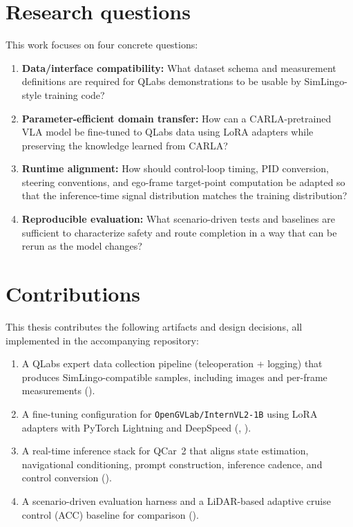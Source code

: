 \section{Research questions}
\label{sec:research-questions}
This work focuses on four concrete questions:
\begin{enumerate}[leftmargin=*,itemsep=0.25em]
  \item \textbf{Data/interface compatibility:} What dataset schema and measurement definitions are required for QLabs demonstrations to be usable by SimLingo-style training code?
  \item \textbf{Parameter-efficient domain transfer:} How can a CARLA-pretrained VLA model be fine-tuned to QLabs data using LoRA adapters while preserving the knowledge learned from CARLA?
  \item \textbf{Runtime alignment:} How should control-loop timing, PID conversion, steering conventions, and ego-frame target-point computation be adapted so that the inference-time signal distribution matches the training distribution?
  \item \textbf{Reproducible evaluation:} What scenario-driven tests and baselines are sufficient to characterize safety and route completion in a way that can be rerun as the model changes?
\end{enumerate}

\section{Contributions}
\label{sec:contributions}
This thesis contributes the following artifacts and design decisions, all implemented in the accompanying repository:
\begin{enumerate}[leftmargin=*,itemsep=0.25em]
  \item A QLabs expert data collection pipeline (teleoperation + logging) that produces SimLingo-compatible samples, including images and per-frame measurements ().
  \item A fine-tuning configuration for \texttt{OpenGVLab/InternVL2-1B} \citep{internvl2} using LoRA adapters \citep{hu2021lora} with PyTorch Lightning \citep{pytorchlightning} and DeepSpeed \citep{deepspeed} (, ).
  \item A real-time inference stack for QCar~2 that aligns state estimation, navigational conditioning, prompt construction, inference cadence, and control conversion ().
  \item A scenario-driven evaluation harness and a LiDAR-based adaptive cruise control (ACC) baseline for comparison ().
\end{enumerate}

